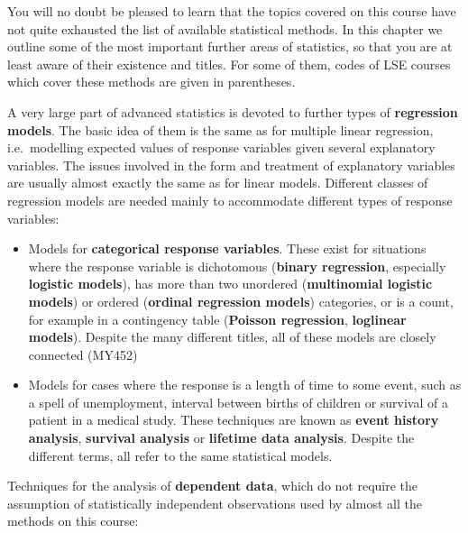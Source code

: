 \documentclass[11pt,a4paper,openany]{book}
\begin{document}
You will no doubt be pleased to learn that the topics covered on this
course have not quite exhausted the list of available statistical
methods. In this chapter we outline some of the most important further
areas of statistics, so that you are at least aware of their existence
and titles. For some of them, codes of LSE courses which cover these
methods are given in parentheses.

A very large part of advanced statistics is devoted to further types of
\textbf{regression models}. The basic idea of them is the same as for
multiple linear regression, i.e.~modelling expected values of response
variables given several explanatory variables. The issues involved in
the form and treatment of explanatory variables are usually almost
exactly the same as for linear models. Different classes of regression
models are needed mainly to accommodate different types of response
variables:

\begin{itemize}
\item
  Models for \textbf{categorical response variables}. These exist for
  situations where the response variable is dichotomous (\textbf{binary
  regression}, especially \textbf{logistic models}), has more than two
  unordered (\textbf{multinomial logistic models}) or ordered
  (\textbf{ordinal regression models}) categories, or is a count, for
  example in a contingency table (\textbf{Poisson regression},
  \textbf{loglinear models}). Despite the many different titles, all of
  these models are closely connected (MY452)
\item
  Models for cases where the response is a length of time to some event,
  such as a spell of unemployment, interval between births of children
  or survival of a patient in a medical study. These techniques are
  known as \textbf{event history analysis}, \textbf{survival analysis}
  or \textbf{lifetime data analysis}. Despite the different terms, all
  refer to the same statistical models.
\end{itemize}

Techniques for the analysis of \textbf{dependent data}, which do not
require the assumption of statistically independent observations used by
almost all the methods on this course:
\end{document}

